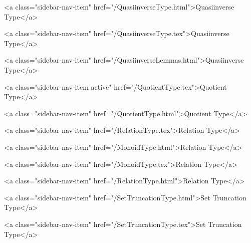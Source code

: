       
    
      
        
          <a class="sidebar-nav-item" href="/QuasiinverseType.html">Quasiinverse Type</a>
        
      
    
      
        
          <a class="sidebar-nav-item" href="/QuasiinverseType.tex">Quasiinverse Type</a>
        
      
    
      
        
          <a class="sidebar-nav-item" href="/QuasiinverseLemmas.html">Quasiinverse Type</a>
        
      
    
      
        
          <a class="sidebar-nav-item active" href="/QuotientType.tex">Quotient Type</a>
        
      
    
      
        
          <a class="sidebar-nav-item" href="/QuotientType.html">Quotient Type</a>
        
      
    
      
        
          <a class="sidebar-nav-item" href="/RelationType.tex">Relation Type</a>
        
      
    
      
        
          <a class="sidebar-nav-item" href="/MonoidType.html">Relation Type</a>
        
      
    
      
        
          <a class="sidebar-nav-item" href="/MonoidType.tex">Relation Type</a>
        
      
    
      
        
          <a class="sidebar-nav-item" href="/RelationType.html">Relation Type</a>
        
      
    
      
        
          <a class="sidebar-nav-item" href="/SetTruncationType.html">Set Truncation Type</a>
        
      
    
      
        
          <a class="sidebar-nav-item" href="/SetTruncationType.tex">Set Truncation Type</a>
        
